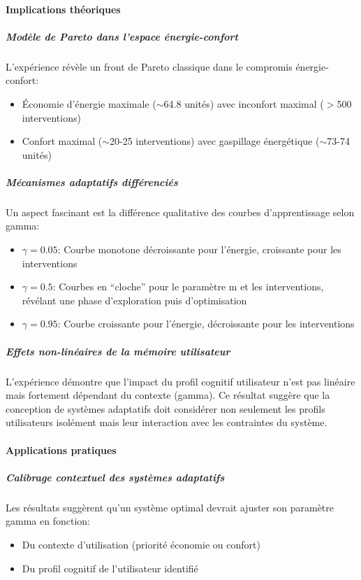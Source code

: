 \documentclass[a4paper,11pt]{article}
\begin{document}
\paragraph{Implications théoriques}

\subparagraph{Modèle de Pareto dans l'espace énergie-confort}
L'expérience révèle un front de Pareto classique dans le compromis énergie-confort:
\begin{itemize}
    \item Économie d'énergie maximale ($\sim$64.8 unités) avec inconfort maximal ($>$500 interventions)
    \item Confort maximal ($\sim$20-25 interventions) avec gaspillage énergétique ($\sim$73-74 unités)
\end{itemize}

\subparagraph{Mécanismes adaptatifs différenciés}
Un aspect fascinant est la différence qualitative des courbes d'apprentissage selon gamma:
\begin{itemize}
    \item $\gamma=0.05$: Courbe monotone décroissante pour l'énergie, croissante pour les interventions
    \item $\gamma=0.5$: Courbes en ``cloche'' pour le paramètre m et les interventions, révélant une phase d'exploration puis d'optimisation
    \item $\gamma=0.95$: Courbe croissante pour l'énergie, décroissante pour les interventions
\end{itemize}

\subparagraph{Effets non-linéaires de la mémoire utilisateur}
L'expérience démontre que l'impact du profil cognitif utilisateur n'est pas linéaire mais fortement dépendant du contexte (gamma). Ce résultat suggère que la conception de systèmes adaptatifs doit considérer non seulement les profils utilisateurs isolément mais leur interaction avec les contraintes du système.

\paragraph{Applications pratiques}

\subparagraph{Calibrage contextuel des systèmes adaptatifs}
Les résultats suggèrent qu'un système optimal devrait ajuster son paramètre gamma en fonction:
\begin{itemize}
    \item Du contexte d'utilisation (priorité économie ou confort)
    \item Du profil cognitif de l'utilisateur identifié
\end{itemize}
\end{document}
